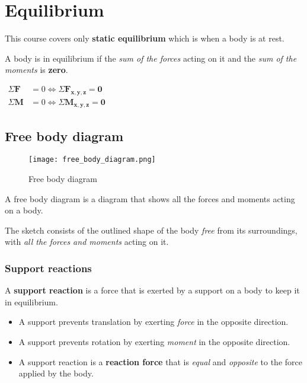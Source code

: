 \documentclass{scrartcl}
\begin{document}
\section{Equilibrium}

This course covers only \textbf{static equilibrium} which is when a body is at rest.

A body is in equilibrium if the \emph{sum of the forces} acting on it and the \emph{sum of the moments} is \textbf{zero}.

\begin{math}
    \begin{aligned}
        \Sigma \mathbf{F} &= 0 \iff \Sigma \mathbf{F_{x, y, z} = 0} \\
        \Sigma \mathbf{M} &= 0 \iff \Sigma \mathbf{M_{x, y, z} = 0}
    \end{aligned}
\end{math}

\subsection{Free body diagram}

\begin{figure}[h]
    \centering
    \texttt{[image: free\_body\_diagram.png]}
    \caption{Free body diagram}
    \label{fig:free_body_diagram}
\end{figure}

A free body diagram is a diagram that shows all the forces and moments acting on a body.

The sketch consists of the outlined shape of the body \emph{free} from its surroundings, 
with \emph{all the forces and moments} acting on it.

\subsubsection{Support reactions}
A \textbf{support reaction} is a force that is exerted by a support on a body to keep it in equilibrium.

\begin{itemize}
    \item A support prevents translation by exerting \emph{force} in the opposite direction.
    \item A support prevents rotation by exerting \emph{moment} in the opposite direction.
\end{itemize}

\begin{itemize}
    \item A support reaction is a \textbf{reaction force} that is \emph{equal} and \emph{opposite} to the force applied by the body.
\end{itemize}
\end{document}

